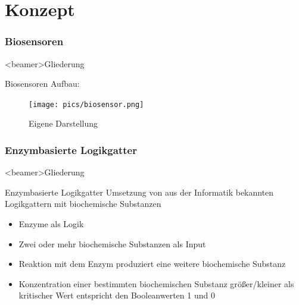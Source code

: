 \documentclass{beamer}
\begin{document}
 	\section{Konzept}
 	
 	\subsubsection{Biosensoren}
 	
 	\begin{frame}<beamer>{Gliederung}
 	\end{frame}
 	
    \begin{frame}{Biosensoren}
       Aufbau: 
        \begin{figure}[H] \centering \texttt{[image: pics/biosensor.png]} \caption{Eigene Darstellung} \label{img:and} 	
       \end{figure}
    \end{frame}



	\subsubsection{Enzymbasierte Logikgatter}
	
	\begin{frame}<beamer>{Gliederung}
	\end{frame}

    \begin{frame}{Enzymbasierte Logikgatter}
    Umsetzung von aus der Informatik bekannten Logikgattern mit biochemische Substanzen
    
    	\begin{itemize}	
    		\item Enzyme als Logik
    		\item Zwei oder mehr biochemische Substanzen als Input
    		\item Reaktion mit dem Enzym produziert eine weitere biochemische Substanz
    		\item Konzentration einer bestimmten biochemischen Substanz gr{\"o}\ss{}er/kleiner als kritischer Wert entspricht den Booleanwerten 1 und 0
    	\end{itemize}     
    \end{frame}
        
\end{document}
